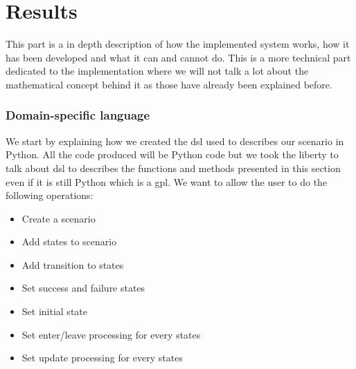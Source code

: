 \documentclass[12pt]{article}
\theoremstyle{definition}
\theoremstyle{definition}
\theoremstyle{remark}
\begin{document}

\clearpage
\part{Results}
\label{chap:Results}

This part is a in depth description of how the implemented system works, how it has been developed and what it can and cannot do. This is a more technical part dedicated to the implementation where we will not talk a lot about the mathematical concept behind it as those have already been explained before.\\

\clearpage




\section{Domain-specific language}


We start by explaining how we created the \gls{dsl} used to describes our scenario in Python. All the code produced will be Python code but we took the liberty to talk about \gls{dsl} to describes the functions and methods presented in this section even if it is still Python which is a \gls{gpl}. We want to allow the user to do the following operations:

\begin{itemize}
\item Create a scenario
\item Add states to scenario
\item Add transition to states
\item Set success and failure states
\item Set initial state
\item Set enter/leave processing for every states
\item Set update processing for every states
\end{itemize}
\end{document}
